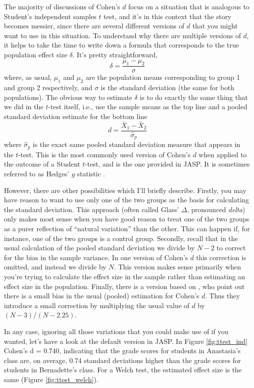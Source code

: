 The majority of discussions of Cohen's $d$ focus on a situation that is analogous to Student's independent samples $t$ test, and it's in this context that the story becomes messier, since there are several different versions of $d$ that you might want to use in this situation. To understand why there are multiple versions of $d$, it helps to take the time to write down a formula that corresponds to the true population effect size $\delta$. It's pretty straightforward, 
$$
\delta = \frac{\mu_1 - \mu_2}{\sigma}
$$
where, as usual, $\mu_1$ and $\mu_2$ are the population means corresponding to group 1 and group 2 respectively, and $\sigma$ is the standard deviation (the same for both populations). The obvious way to estimate $\delta$ is to do exactly the same thing that we did in the $t$-test itself, i.e., use the sample means as the top line and a pooled standard deviation estimate for the bottom line
$$
d = \frac{\bar{X}_1 - \bar{X}_2}{\hat{\sigma}_p}
$$
where $\hat\sigma_p$ is the exact same pooled standard deviation measure that appears in the $t$-test. This is the most commonly used version of Cohen's $d$ when applied to the outcome of a Student $t$-test, and is the one provided in JASP. It is sometimes referred to as Hedges' $g$ statistic \parencite{Hedges1981}. 

However, there are other possibilities which I'll briefly describe. Firstly, you may have reason to want to use only one of the two groups as the basis for calculating the standard deviation. This approach (often called Glass' $\Delta$, pronounced {\it delta}) only makes most sense when you have good reason to treat one of the two groups as a purer reflection of ``natural variation'' than the other. This can happen if, for instance, one of the two groups is a control group. Secondly, recall that in the usual calculation of the pooled standard deviation we divide by $N-2$ to correct for the bias in the sample variance. In one version of Cohen's $d$ this correction is omitted, and instead we divide by $N$. This version makes sense primarily when you're trying to calculate the effect size in the sample rather than estimating an effect size in the population. Finally, there is a version based on \textcite{Hedges1985}, who point out there is a small bias in the usual (pooled) estimation for Cohen's $d$. Thus they introduce a small correction by multiplying the usual value of $d$ by $(N-3)/(N-2.25)$. 

In any case, ignoring all those variations that you could make use of if you wanted, let's have a look at the default version in JASP. In Figure \ref{fig:ttest_ind} Cohen's d = 0.740, indicating that the grade scores for students in Anastasia's class are, on average, 0.74 standard deviations higher than the grade scores for students in Bernadette's class. For a Welch test, the estimated effect size is the same (Figure \ref{fig:ttest_welch}).

